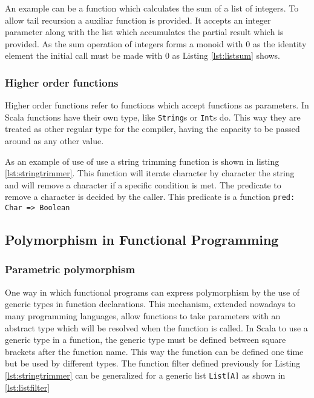 \documentclass[../main.tex]{subfiles}
\begin{document}
An example can be a function which calculates the sum of a list of integers. To
allow tail recursion a auxiliar function is provided. It accepts an integer
parameter along with the list which accumulates the partial result which is
provided. As the sum operation of integers forms a monoid with 0 as the identity
element the initial call must be made with 0 as Listing \ref{lst:listsum} shows.




\subsubsection{Higher order functions} Higher order functions refer to functions
which accept functions as parameters. In Scala functions have their own type,
like \texttt{String}s or \texttt{Int}s do. This way they are treated as other
regular type for the compiler, having the capacity to be passed around as any
other value.

As an example of use of use a string trimming function is shown in listing \ref{lst:stringtrimmer}. This
function will iterate character by character the string and will remove a
character if a specific condition is met. The predicate to remove a character is
decided by the caller. This predicate is a function \texttt{pred: Char => Boolean}



\subsection{Polymorphism in Functional Programming}
\subsubsection{Parametric polymorphism}

One way in which functional programs can express polymorphism by the use of
generic types in function declarations. This mechanism, extended nowadays to
many programming languages, allow functions to take parameters
with an abstract type which will be resolved when the function is called. In Scala to use a generic type in a
function, the generic type
must be defined between square brackets after the function name. This way the
function can be defined one time but be used by different types. The function
filter defined previously for Listing \ref{lst:stringtrimmer} can be generalized
for a generic list \texttt{List[A]} as shown in \ref{lst:listfilter}
\end{document}
